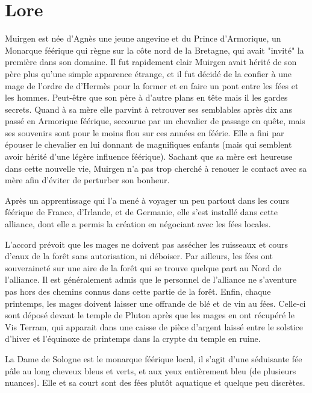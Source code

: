 
\section*{Lore}

Muirgen est née d'Agnès une jeune angevine et du Prince d'Armorique, un Monarque féérique qui règne sur la côte nord de la Bretagne, qui avait "invité" la première dans son domaine. Il fut rapidement clair Muirgen avait hérité de son père plus qu'une simple apparence étrange, et il fut décidé de la confier à une mage de l'ordre de d'Hermès pour la former et en faire un pont entre les fées et les hommes. Peut-être que son père à d'autre plans en tête mais il les gardes secrets. Quand à sa mère elle parvint à retrouver ses semblables après dix ans passé en Armorique féérique, secourue par un chevalier de passage en quête, mais ses souvenirs sont pour le moins flou sur ces années en féérie. Elle a fini par épouser le chevalier en lui donnant de magnifiques enfants (mais qui semblent avoir hérité d'une légère influence féérique). Sachant que sa mère est heureuse dans cette nouvelle vie, Muirgen n'a pas trop cherché à renouer le contact avec sa mère afin d'éviter de perturber son bonheur.

Après un apprentissage qui l'a mené à voyager un peu partout dans les cours féérique de France, d'Irlande, et de Germanie, elle s'est installé dans cette alliance, dont elle a permis la création en négociant avec les fées locales.

L'accord prévoit que les mages ne doivent pas assécher les ruisseaux et cours d'eaux de la forêt sans autorisation, ni déboiser. Par ailleurs, les fées ont souveraineté sur une aire de la forêt qui se trouve quelque part au Nord de l'alliance. Il est généralement admis que le personnel de l'alliance ne s'aventure pas hors des chemins connus dans cette partie de la forêt. Enfin, chaque printemps, les mages doivent laisser une offrande de blé et de vin au fées. Celle-ci sont déposé devant le temple de Pluton après que les mages en ont récupéré le Vis Terram, qui apparait dans une caisse de pièce d'argent laissé entre le solstice d'hiver et l'équinoxe de printemps dans la crypte du temple en ruine.

La Dame de Sologne est le monarque féérique local, il s'agit d'une séduisante fée pâle au long cheveux bleus et verts, et aux yeux entièrement bleu (de plusieurs nuances). Elle et sa court sont des fées plutôt aquatique et quelque peu discrètes.

